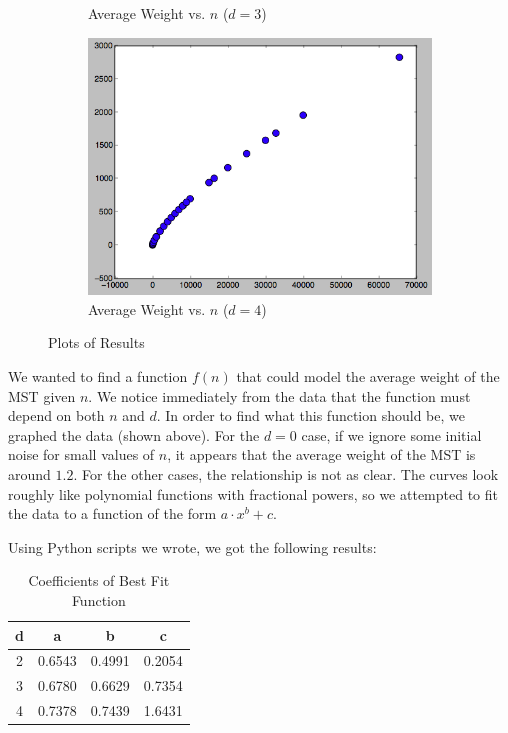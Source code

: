 \documentclass[12pt]{article}
\begin{document}
\begin{figure}
\begin{subfigure}{.5\textwidth}
  \caption{Average Weight vs. $n$ ($d = 3$)}
  \label{fig:sub3}
\end{subfigure}%
\begin{subfigure}{.5\textwidth}
  \centering
  \includegraphics[width=0.8\linewidth]{img/result4.png}
  \caption{Average Weight vs. $n$ ($d = 4$)}
  \label{fig:sub4}
\end{subfigure}%
\caption{Plots of Results}
\end{figure}

We wanted to find a function $f(n)$ that could model the average weight of the MST given $n$. We notice immediately from the data that the function must depend on both $n$ and $d$. In order to find what this function should be, we graphed the data (shown above). For the $d = 0$ case, if we ignore some initial noise for small values of $n$, it appears that the average weight of the MST is around $1.2$. For the other cases, the relationship is not as clear. The curves look roughly like polynomial functions with fractional powers, so we attempted to fit the data to a function of the form $a \cdot x ^ b + c$. 

Using Python scripts we wrote, we got the following results:

\begin{table}[h!]
\centering
\caption{Coefficients of Best Fit Function}
\begin{tabular} {c | c | c | c }
d&a&b&c\\ \hline
2&0.6543&0.4991&0.2054\\
3&0.6780&0.6629&0.7354\\
4&0.7378&0.7439&1.6431\\
\end{tabular}
\label{table:3}
\end{table}
\end{document}
